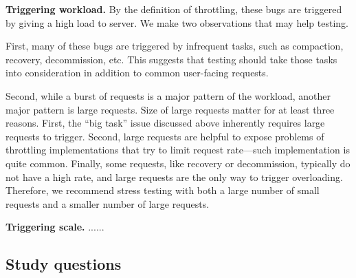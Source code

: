 \vspace{.05in}
\noindent
\textbf{Triggering workload.} By the definition of throttling, these bugs are triggered
by giving a high load to server. We make two observations that may help testing.

First, many of these bugs are triggered by infrequent tasks, such as compaction, recovery,
decommission, etc. This suggests that testing should take those tasks into consideration
in addition to common user-facing requests.

Second, while a burst of requests is a major pattern of the workload, another major pattern
is large requests. Size of large requests matter for at least three reasons. First, the ``big task''
issue discussed above inherently requires large requests to trigger. Second, large requests
are helpful to expose problems of throttling implementations that try to limit request rate---such
implementation is quite common. Finally, some requests, like recovery or decommission, typically
do not have a high rate, and large requests are the only way to trigger overloading. Therefore,
we recommend stress testing with both a large number of small requests and a smaller number
of large requests.

\vspace{.05in}
\noindent
\textbf{Triggering scale.} ......


\iffalse
\subsection{Study questions}


